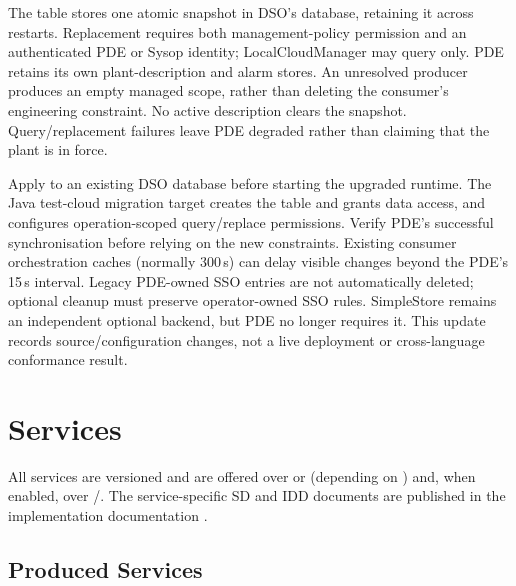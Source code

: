 \documentclass[a4paper]{arrowhead}
\begin{document}
The  table stores one atomic snapshot in DSO's database,
retaining it across restarts. Replacement requires both management-policy permission and
an authenticated PDE or Sysop identity; LocalCloudManager may query only. PDE retains its
own plant-description and alarm stores. An unresolved producer produces an empty managed
scope, rather than deleting the consumer's engineering constraint. No active description
clears the snapshot. Query/replacement failures leave PDE degraded rather than claiming
that the plant is in force.

Apply  to an existing DSO database before starting the
upgraded runtime. The Java test-cloud migration target creates the table and grants data
access, and configures operation-scoped query/replace permissions. Verify PDE's successful
synchronisation before relying on the new constraints. Existing consumer orchestration
caches (normally 300\,s) can delay visible changes beyond the PDE's 15\,s interval.
Legacy PDE-owned SSO entries are not automatically deleted; optional cleanup must preserve
operator-owned SSO rules. SimpleStore remains an independent optional backend, but PDE no
longer requires it. This update records source/configuration changes, not a live deployment
or cross-language conformance result.

\section{Services}
\label{sec:services}

All services are versioned  and are offered over  or
 (depending on ) and, when enabled, over
/. The service-specific SD and IDD documents
are published in the implementation documentation \cite{ah5docs}.

\subsection{Produced Services}
\end{document}

